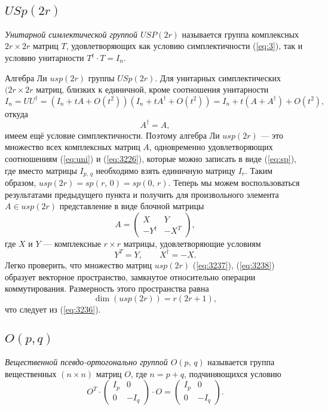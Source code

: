 \documentclass[a4paper,12pt]{article}
\begin{document}
\subsection{$USp(2r)$ }
\begin{dfn}
	\emph{Унитарной симлектической группой $USP(2r)$} называется
	группа комплексных $2r \times 2r$ матриц $T$, удовлетворяющих как условию
	симплектичности  (\ref{eq:3}), так и условию унитарности $T^\dag \cdot
	T=I_n$.
\end{dfn}
Алгебра Ли $usp(2r)$ группы $USp(2r)$. Для унитарных симплектических
$(2r \times 2r$ матриц, близких к единичной, кроме соотношения унитарности
\begin{equation}
	I_n = U U^\dag = (I_n + t A + O(t^2))(I_n+t A^\dag + O(t^2))= I_n+
	t(A +A^\dag) + O(t^2)
,\end{equation}
откуда
\begin{equation}
	A^\dag = A
	\label{eq:uni}
,\end{equation}
имеем ещё условие симплектичности. Поэтому алгебра Ли $usp(2r)$ --- это
множество всех комплексных матриц $A$, одновременно удовлетворяющих
соотношениям (\ref{eq:uni}) и (\ref{eq:3226}), которые можно записать в виде
(\ref{eq:sp}), где вместо матрицы $I_{p,\,q}$ необходимо взять единичную
матрицу $I_r$. Таким образом, $usp(2r)=sp(r,\,0)=sp(0,\,r)$. Теперь мы можем
воспользоваться результатами предыдущего пункта и получить для произвольного
элемента $A \in  usp(2r)$ представление в виде блочной матрицы
 \begin{equation}
	 A = \begin{pmatrix}  X & Y \\ -Y^\dag & -X^T \end{pmatrix} 
	 \label{eq:3237}
,\end{equation}
где $X$ и $Y$ --- комплексные $r \times r$ матрицы, удовлетворяющие условиям
\begin{equation}
	Y^T=Y, \qquad X^\dag=-X
	\label{eq:3238}
.\end{equation}
Легко проверить, что множество матриц $usp(2r)$ (\ref{eq:3237}),
(\ref{eq:3238}) образует векторное пространство, замкнутое относительно
операции коммутирования. Размерность этого пространства равна
\begin{equation}
	\dim (usp(2r))=r(2r+1),
\end{equation} 
что следует из (\ref{eq:3236}).
\subsection{$O(p, q)$ }
\begin{dfn}
	\emph{Вещественной псевдо-ортогонально группой $O(p,\,q)$} называется
	группа вещественных $(n \times n)$ матриц $O$, где $n=p+q$, подчиняющихся
	условию
	\begin{equation}
		O^T \cdot
		\begin{pmatrix} 
		I_p & 0 \\
	0 & -I_q
\end{pmatrix}
\cdot O = 
\begin{pmatrix} 
I_p & 0 \\
0 & -I_q\end{pmatrix} 
	.
	\label{eq:6}
	\end{equation}
\end{dfn}
\end{document}

